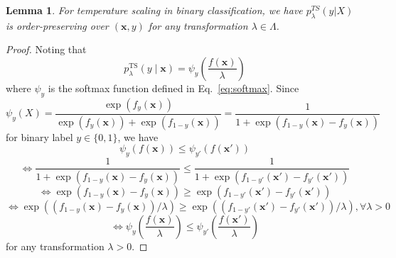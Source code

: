 \documentclass{article}
\newcommand{\1}{\mathbbm{1}}
\newcommand{\Eqref}[1]{Eq.~\eqref{#1}}
\theoremstyle{plain}
\newtheorem{lemma}[theorem]{Lemma}
\theoremstyle{definition}
\theoremstyle{remark}
\begin{document}
\begin{lemma}
    \label{lemma:order_preserving_ts_sample}
    For temperature scaling in binary classification, we have \(p^{TS}_\lambda(y|X)\) is order-preserving over \((\boldsymbol{x},y)\) for any transformation \(\lambda \in \Lambda\).
\end{lemma}

\begin{proof}
    Noting that 
    \begin{equation*}
        p^{\text{TS}}_{\lambda}(y\mid \boldsymbol{x}) = \psi_y\left(\frac{f(\boldsymbol{x})}{\lambda}\right)
    \end{equation*}
    where \(\psi_y\) is the softmax function defined in \Eqref{eq:softmax}. Since 
    \begin{equation*}
        \psi_y(X) = \frac{\exp{(f_y(\boldsymbol{x}))}}{\exp{(f_y(\boldsymbol{x}))}+\exp{(f_{1-y}(\boldsymbol{x}))}} = \frac{1}{1+\exp{(f_{1-y}(\boldsymbol{x})-f_y(\boldsymbol{x}))}}
    \end{equation*}
    for binary label \(y \in \{0,1\}\), we have
    \begin{equation*}
        \psi_y(f(\boldsymbol{x})) \leq \psi_{y'}(f(\boldsymbol{x}'))
    \end{equation*}
    \begin{equation*}
         \iff \frac{1}{1+\exp{(f_{1-y}(\boldsymbol{x})-f_y(\boldsymbol{x}))}} \leq \frac{1}{1+\exp{(f_{1-y'}(\boldsymbol{x}')-f_{y'}(\boldsymbol{x}'))}}
    \end{equation*}
    \begin{equation*}
        \iff \exp{(f_{1-y}(\boldsymbol{x})-f_y(\boldsymbol{x}))} \geq \exp{(f_{1-y'}(\boldsymbol{x}')-f_{y'}(\boldsymbol{x}'))}
    \end{equation*}
    \begin{equation*}
        \iff \exp{((f_{1-y}(\boldsymbol{x})-f_y(\boldsymbol{x}))/\lambda)} \geq \exp{((f_{1-y'}(\boldsymbol{x}')-f_{y'}(\boldsymbol{x}'))/\lambda)}, \forall \lambda > 0
    \end{equation*}
    \begin{equation*}
        \iff \psi_y\left(\frac{f(\boldsymbol{x})}{\lambda}\right) \leq \psi_{y'}\left(\frac{f(\boldsymbol{x}')}{\lambda}\right)
    \end{equation*}
    for any transformation \(\lambda>0\).
\end{proof}
\end{document}
